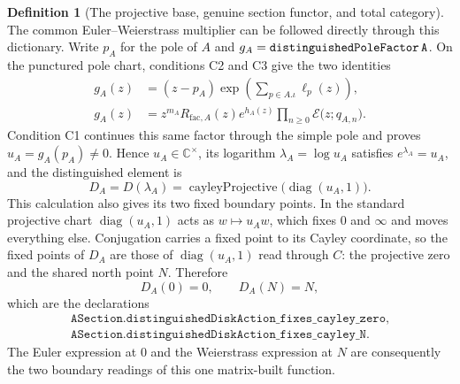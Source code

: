 \documentclass[11pt]{article}
\newcommand{\CC}{\mathbb{C}}
\theoremstyle{plain}
\theoremstyle{definition}
\newtheorem{definition}[theorem]{Definition}
\theoremstyle{remark}
\begin{document}
\begin{definition}[The projective base, genuine section functor, and total category]
The common Euler--Weierstrass multiplier can be followed directly through this dictionary. Write
$p_A$ for the pole of $A$ and $g_A=\texttt{distinguishedPoleFactor\,A}$. On the punctured pole chart, conditions
\textup{C2} and \textup{C3} give the two identities
\[
\begin{aligned}
 g_A(z)
   &=(z-p_A)
     \exp\!\left(\sum_{p\in A.\iota}\ell_p(z)\right),\\[2pt]
 g_A(z)
   &=z^{m_A}R_{\mathrm{fac},A}(z)e^{h_A(z)}
     \prod_{n\geq0}\mathcal E\bigl(z;q_{A,n}\bigr).
\end{aligned}
\]
Condition \textup{C1} continues this same factor through the simple pole and proves
$u_A=g_A(p_A)\neq0$. Hence $u_A\in\CC^\times$, its logarithm
$\lambda_A=\log u_A$ satisfies $e^{\lambda_A}=u_A$, and the distinguished element is
\[
 D_A=D(\lambda_A)
   =\operatorname{cayleyProjective}\bigl(\operatorname{diag}(u_A,1)\bigr).
\]
This calculation also gives its two fixed boundary points. In the standard
projective chart $\operatorname{diag}(u_A,1)$ acts as $w\mapsto u_Aw$, which
fixes $0$ and $\infty$ and moves everything else. Conjugation carries a fixed
point to its Cayley coordinate, so the fixed points of $D_A$ are those of
$\operatorname{diag}(u_A,1)$ read through $C$: the projective zero and the
shared north point $N$. Therefore
\[
  D_A(0)=0,\qquad D_A(N)=N,
\]
which are the declarations
\[
\begin{gathered}
\texttt{ASection.distinguishedDiskAction\_fixes\_cayley\_zero},\\
\texttt{ASection.distinguishedDiskAction\_fixes\_cayley\_N}.
\end{gathered}
\]
The Euler expression at $0$ and the
Weierstrass expression at $N$ are consequently the two boundary readings of this one matrix-built
function.


\end{definition}
\end{document}
